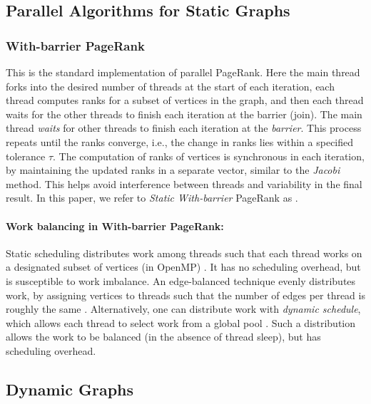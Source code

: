 \subsection{Parallel Algorithms for Static Graphs}
\label{sec:about-static}

\subsubsection{With-barrier PageRank \cite{rank-garg16}}
\label{sec:withbarrier}

This is the standard implementation of parallel PageRank. Here the main thread forks into the desired number of threads at the start of each iteration, each thread computes ranks for a subset of vertices in the graph, and then each thread waits for the other threads to finish each iteration at the barrier (join). The main thread \textit{waits} for other threads to finish each iteration at the \textit{barrier}. This process repeats until the ranks converge, i.e., the change in ranks lies within a specified tolerance $\tau$. The computation of ranks of vertices is synchronous in each iteration, by maintaining the updated ranks in a separate vector, similar to the \textit{Jacobi} method. This helps avoid interference between threads and variability in the final result. In this paper, we refer to \textit{Static With-barrier} PageRank as \StaWbar{}.

\paragraph{Work balancing in With-barrier PageRank:}

Static scheduling distributes work among threads such that each thread works on a designated subset of vertices (in OpenMP) \cite{openmp-chapman07}. It has no scheduling overhead, but is susceptible to work imbalance. An edge-balanced technique evenly distributes work, by assigning vertices to threads such that the number of edges per thread is roughly the same \cite{rank-eedi22}. Alternatively, one can distribute work with \textit{dynamic schedule}, which allows each thread to select work from a global pool \cite{openmp-chapman07}. Such a distribution allows the work to be balanced (in the absence of thread sleep), but has scheduling overhead.




\subsection{Dynamic Graphs}
\label{sec:about-dynamic}

